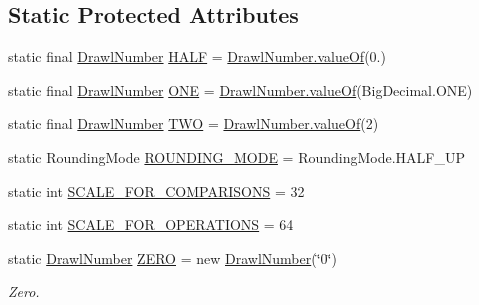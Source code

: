 \subsection*{Static Protected Attributes}
\begin{DoxyCompactItemize}
\item 
static final \hyperlink{classcom_1_1aarrelaakso_1_1drawl_1_1_drawl_number}{Drawl\+Number} \hyperlink{classcom_1_1aarrelaakso_1_1drawl_1_1_drawl_number_ae0980b8dd35b0bb52b87b37700d15322}{H\+A\+LF} = \hyperlink{classcom_1_1aarrelaakso_1_1drawl_1_1_drawl_number_a4654022f4252c55f6aebd69494db301c}{Drawl\+Number.\+value\+Of}(0.)
\item 
static final \hyperlink{classcom_1_1aarrelaakso_1_1drawl_1_1_drawl_number}{Drawl\+Number} \hyperlink{classcom_1_1aarrelaakso_1_1drawl_1_1_drawl_number_a0cd06e1d6344869ed300bc99afcde20a}{O\+NE} = \hyperlink{classcom_1_1aarrelaakso_1_1drawl_1_1_drawl_number_a4654022f4252c55f6aebd69494db301c}{Drawl\+Number.\+value\+Of}(Big\+Decimal.\+O\+NE)
\item 
static final \hyperlink{classcom_1_1aarrelaakso_1_1drawl_1_1_drawl_number}{Drawl\+Number} \hyperlink{classcom_1_1aarrelaakso_1_1drawl_1_1_drawl_number_a2bb7476cfb1cc76e2742cd00feb463c3}{T\+WO} = \hyperlink{classcom_1_1aarrelaakso_1_1drawl_1_1_drawl_number_a4654022f4252c55f6aebd69494db301c}{Drawl\+Number.\+value\+Of}(2)
\item 
static Rounding\+Mode \hyperlink{classcom_1_1aarrelaakso_1_1drawl_1_1_drawl_number_ab4b44bb0675da90d8f435286911b711e}{R\+O\+U\+N\+D\+I\+N\+G\+\_\+\+M\+O\+DE} = Rounding\+Mode.\+H\+A\+L\+F\+\_\+\+UP
\item 
static int \hyperlink{classcom_1_1aarrelaakso_1_1drawl_1_1_drawl_number_ace1cb62d1ecce8212578d1a13cf5cbc4}{S\+C\+A\+L\+E\+\_\+\+F\+O\+R\+\_\+\+C\+O\+M\+P\+A\+R\+I\+S\+O\+NS} = 32
\item 
static int \hyperlink{classcom_1_1aarrelaakso_1_1drawl_1_1_drawl_number_ab9bb5bf4986830f56f01cb218ba637ce}{S\+C\+A\+L\+E\+\_\+\+F\+O\+R\+\_\+\+O\+P\+E\+R\+A\+T\+I\+O\+NS} = 64
\item 
static \hyperlink{classcom_1_1aarrelaakso_1_1drawl_1_1_drawl_number}{Drawl\+Number} \hyperlink{classcom_1_1aarrelaakso_1_1drawl_1_1_drawl_number_a14c9ceff1fb3f2bd5c3b380183db933a}{Z\+E\+RO} = new \hyperlink{classcom_1_1aarrelaakso_1_1drawl_1_1_drawl_number}{Drawl\+Number}(\char`\"{}0\char`\"{})
\begin{DoxyCompactList}\small\item\em Zero. \end{DoxyCompactList}\item 

\end{DoxyCompactItemize}
